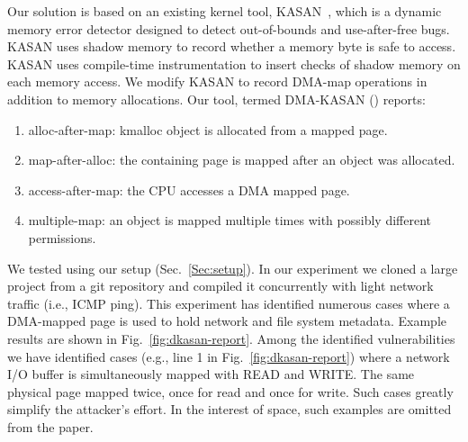 Our solution is based on an existing kernel tool, KASAN~\cite{kasan}, which is a dynamic memory error detector designed to detect out-of-bounds and use-after-free bugs. KASAN uses shadow memory to record whether a memory byte is safe to access. KASAN uses compile-time instrumentation to insert checks of shadow memory on each memory access. 
We modify KASAN to record DMA-map operations in addition to memory allocations. Our tool, termed DMA-KASAN (\dkasan) reports: 
\begin{enumerate}
    \item alloc-after-map:  kmalloc object is allocated from a mapped page.
    \item map-after-alloc:  the containing page is mapped after an object was allocated.
    \item access-after-map: the CPU accesses a DMA mapped page.
    \item multiple-map: an object is mapped multiple times with possibly different permissions.
\end{enumerate}
We tested \dkasan using our setup (Sec.~\ref{Sec:setup}).
In our experiment we cloned a large project from a git repository and compiled it concurrently with light network traffic (i.e., ICMP ping). This experiment has identified numerous cases where a DMA-mapped page is used to hold network and file system metadata. Example results are shown in Fig.~\ref{fig:dkasan-report}. 
Among the identified vulnerabilities we have identified cases (e.g., line 1 in Fig.~\ref{fig:dkasan-report}) where a network I/O buffer is simultaneously mapped with READ and WRITE. The same physical page mapped twice, once for read and once for write. Such cases greatly simplify the attacker's effort. In the interest of space, such examples are omitted from the paper. 

